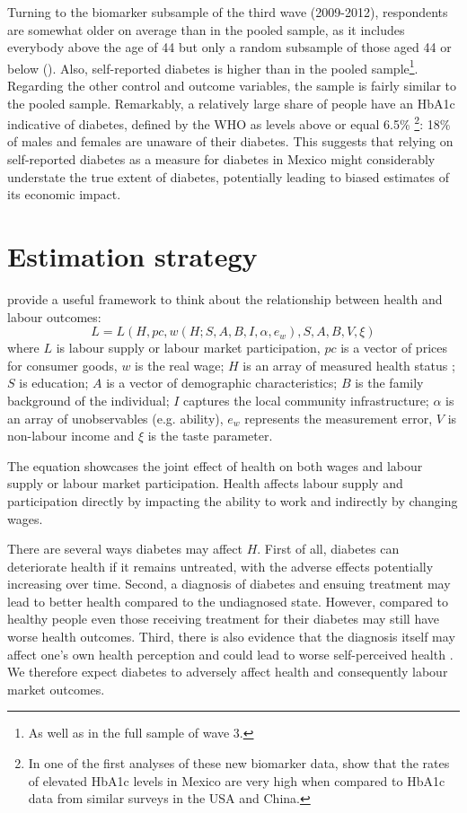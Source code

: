 Turning to the biomarker subsample of the third wave (2009-2012), respondents are somewhat older on average than in the pooled sample, as it includes everybody above the age of 44 but only a random subsample of those aged 44 or below (\cite{Crimmins2015}). Also, self-reported diabetes is higher than in the pooled sample\footnote{As well as in the full sample of wave 3.}. Regarding the other control and outcome variables, the sample is fairly similar to the pooled sample. Remarkably, a relatively large share of people have an \ac{HbA1c} indicative of diabetes, defined by the \ac{WHO} as levels above or equal 6.5\% \parencite{WorldHealthOrganization2011}\footnote{In one of the first analyses of these new biomarker data, \textcite{Frankenberg2015} show that the rates of elevated \ac{HbA1c} levels in Mexico are very high when compared to \ac{HbA1c} data from similar surveys in the USA and China.}: 18\% of males and females are unaware of their diabetes. This suggests that relying on self-reported diabetes as a measure for diabetes in Mexico might considerably understate the true extent of diabetes, potentially leading to biased estimates of its economic impact.

\section{\label{sec:Estimation Strategy}Estimation strategy}
 
\textcite{Strauss1998} provide a useful framework to think about the relationship between health and labour outcomes:
\begin{equation}
L=L(H, pc, w(H;S,A,B,I,\alpha,e_{w}), S, A, B, V, \xi) \label{eq:wage}
\end{equation}
where $L$ is labour supply or labour market participation, $pc $ is a vector of prices for consumer goods, $w$ is the real wage; $H$ is an array of measured health status ; $S$ is education; $A$ is a vector of demographic characteristics; $B$ is the family background of the individual; $I$ captures the local community infrastructure; $\alpha$ is an array of unobservables (e.g. ability), $e_w$ represents the measurement error, $V$ is non-labour income and $\xi$ is the taste parameter. 

The equation showcases the joint effect of health on both wages and labour supply or labour market participation. Health affects labour supply and participation directly by impacting the ability to work and indirectly by changing wages.

There are several ways diabetes may affect $H$. First of all, diabetes can deteriorate health if it remains untreated, with the adverse effects potentially increasing over time. Second, a diagnosis of diabetes and ensuing treatment may lead to better health compared to the undiagnosed state. However, compared to healthy people even those receiving treatment for their diabetes may still have worse health outcomes. Third, there is also evidence that the diagnosis itself may affect one's own health perception and could lead to worse self-perceived health \parencite{Thoolen2006}. We therefore expect diabetes to adversely affect health and consequently labour market outcomes.

